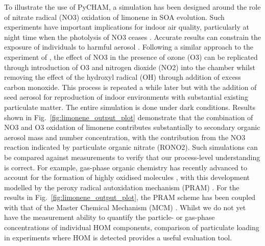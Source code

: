 \documentclass[gmd, manuscript]{copernicus}
\begin{document}
To illustrate the use of PyCHAM, a simulation has been designed around the role of nitrate radical (NO3) oxidation of limonene in SOA evolution.  Such experiments have important implications for indoor air quality, particularly at night time when the photolysis of NO3 ceases \citep{Waring2015}.  Accurate results can constrain the exposure of individuals to harmful aerosol \citep{Carslaw2019}.  Following a similar approach to the experiment of \citet{Fry2011}, the effect of NO3 in the presence of ozone (O3) can be replicated through introduction of O3 and nitrogen dioxide (NO2) into the chamber whilst removing the effect of the hydroxyl radical (OH) through addition of excess carbon monoxide.  This process is repeated a while later but with the addition of seed aerosol for reproduction of indoor environments with substantial existing particulate matter.  The entire simulation is done under dark conditions.  Results shown in Fig.~\ref{fig:limonene_output_plot} demonstrate that the combination of NO3 and O3 oxidation of limonene contributes substantially to secondary organic aerosol mass and number concentration, with the contribution from the NO3 reaction indicated by particulate organic nitrate (RONO2).  Such simulations can be compared against measurements to verify that our process-level understanding is correct.  For example, gas-phase organic chemistry has recently advanced to account for the formation of highly oxidised molecules \citep{Ehn2014}, with this development modelled by the peroxy radical autoxidation mechanism (PRAM) \citep{Roldin2019}.  For the results in Fig.~\ref{fig:limonene_output_plot}, the PRAM scheme has been coupled with that of the Master Chemical Mechanism (MCM) \citep{Jenkin1997, Saunders2003}.  Whilst we do not yet have the measurement ability to quantify the particle- or gas-phase concentrations of individual HOM components, comparison of particulate loading in experiments where HOM is detected provides a useful evaluation tool.
\end{document}
